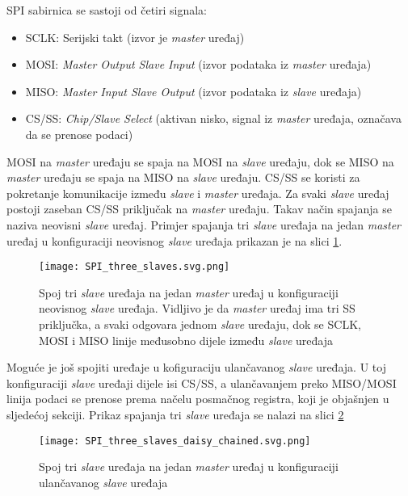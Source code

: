 SPI sabirnica se sastoji od četiri signala:
\begin{itemize}
	\item SCLK: Serijski takt (izvor je \textit{master} uređaj)
	\item MOSI: \textit{Master Output Slave Input} (izvor podataka iz \textit{master} uređaja)
	\item MISO: \textit{Master Input Slave Output} (izvor podataka iz \textit{slave} uređaja)
	\item CS/SS: \textit{Chip/Slave Select} (aktivan nisko, signal iz \textit{master} uređaja, označava da se prenose podaci)
\end{itemize}
MOSI na \textit{master} uređaju se spaja na MOSI na \textit{slave} uređaju, dok se MISO na \textit{master} uređaju se spaja na MISO na \textit{slave} uređaju. CS/SS se koristi za pokretanje komunikacije između \textit{slave} i \textit{master} uređaja. Za svaki \textit{slave} uređaj postoji zaseban CS/SS priključak na \textit{master} uređaju. Takav način spajanja se naziva neovisni \textit{slave} uređaj. Primjer spajanja tri \textit{slave} uređaja na jedan \textit{master} uređaj u konfiguraciji neovisnog \textit{slave} uređaja prikazan je na slici \ref{fig:spi_three_slaves}.
\begin{figure}[H]
	\centering
	\texttt{[image: SPI\_three\_slaves.svg.png]}
	\caption{Spoj tri \textit{slave} uređaja na jedan \textit{master} uređaj u konfiguraciji neovisnog \textit{slave} uređaja. Vidljivo je da \textit{master} uređaj ima tri SS priključka, a svaki odgovara jednom \textit{slave} uređaju, dok se SCLK, MOSI i MISO linije međusobno dijele između \textit{slave} uređaja \cite{spi_wikipedia}}
	\label{fig:spi_three_slaves}
\end{figure}
Moguće je još spojiti uređaje u kofiguraciju ulančavanog \textit{slave} uređaja. U toj konfiguraciji \textit{slave} uređaji dijele isi CS/SS, a ulančavanjem preko MISO/MOSI linija podaci se prenose prema načelu posmačnog registra, koji je objašnjen u sljedećoj sekciji. Prikaz spajanja tri \textit{slave} uređaja se nalazi na slici \ref{fig:SPI_three_slaves_daisy_chained}
\begin{figure}[H]
	\centering
	\texttt{[image: SPI\_three\_slaves\_daisy\_chained.svg.png]}
	\caption{Spoj tri \textit{slave} uređaja na jedan \textit{master} uređaj u konfiguraciji ulančavanog \textit{slave} uređaja \cite{spi_wikipedia}}
	\label{fig:SPI_three_slaves_daisy_chained}
\end{figure}

